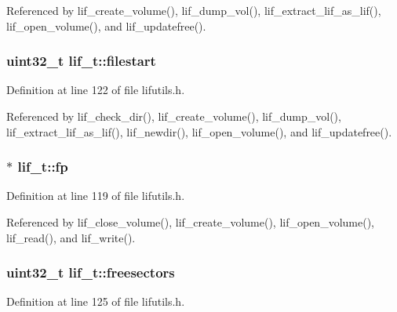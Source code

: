 Referenced by lif\+\_\+create\+\_\+volume(), lif\+\_\+dump\+\_\+vol(), lif\+\_\+extract\+\_\+lif\+\_\+as\+\_\+lif(), lif\+\_\+open\+\_\+volume(), and lif\+\_\+updatefree().

\subsubsection[{\texorpdfstring{filestart}{filestart}}]{\setlength{\rightskip}{0pt plus 5cm}uint32\+\_\+t lif\+\_\+t\+::filestart}\hypertarget{structlif__t_a3c1bcc66b694d07ebc304ef7cb66b4ef}{}\label{structlif__t_a3c1bcc66b694d07ebc304ef7cb66b4ef}


Definition at line 122 of file lifutils.\+h.



Referenced by lif\+\_\+check\+\_\+dir(), lif\+\_\+create\+\_\+volume(), lif\+\_\+dump\+\_\+vol(), lif\+\_\+extract\+\_\+lif\+\_\+as\+\_\+lif(), lif\+\_\+newdir(), lif\+\_\+open\+\_\+volume(), and lif\+\_\+updatefree().

\subsubsection[{\texorpdfstring{fp}{fp}}]{$\ast$ lif\+\_\+t\+::fp}\hypertarget{structlif__t_ad679ba16ca21371a649981a4cca9e64c}{}\label{structlif__t_ad679ba16ca21371a649981a4cca9e64c}


Definition at line 119 of file lifutils.\+h.



Referenced by lif\+\_\+close\+\_\+volume(), lif\+\_\+create\+\_\+volume(), lif\+\_\+open\+\_\+volume(), lif\+\_\+read(), and lif\+\_\+write().

\subsubsection[{\texorpdfstring{freesectors}{freesectors}}]{\setlength{\rightskip}{0pt plus 5cm}uint32\+\_\+t lif\+\_\+t\+::freesectors}\hypertarget{structlif__t_a1fc11461eb5643d84e229772f7623152}{}\label{structlif__t_a1fc11461eb5643d84e229772f7623152}


Definition at line 125 of file lifutils.\+h.



